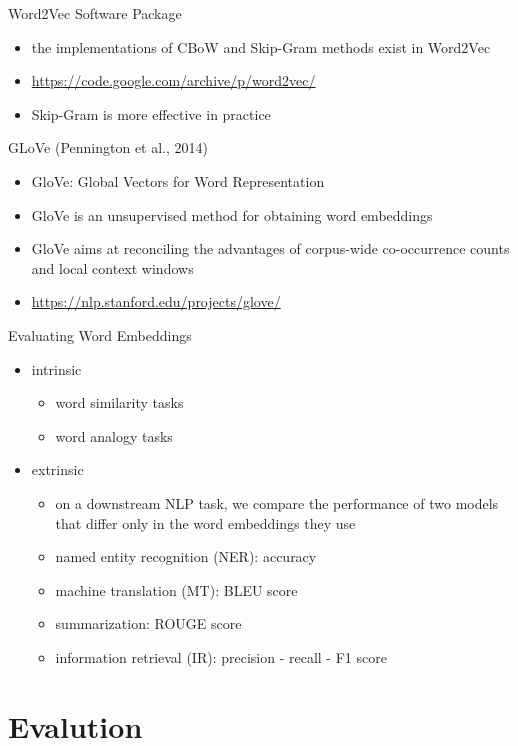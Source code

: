 \documentclass[12pt, handout]{beamer}
\begin{document}
\begin{frame}{Word2Vec Software Package}
	\begin{itemize}
		\item<1-> the implementations of CBoW and Skip-Gram methods exist in Word2Vec
		\item<1-> \url{https://code.google.com/archive/p/word2vec/}
		\item<2-> Skip-Gram is more effective in practice
	\end{itemize}
\end{frame}
\begin{frame}{GLoVe (Pennington et al., 2014)}\begin{itemize}
		\item GloVe: Global Vectors for Word Representation
		\item GloVe is an unsupervised method for obtaining word embeddings
		\item GloVe aims at reconciling the advantages of corpus-wide co-occurrence counts and local context windows
		\item \url{https://nlp.stanford.edu/projects/glove/}
	\end{itemize}
\end{frame}
\begin{frame}{Evaluating Word Embeddings}
	\begin{itemize}
		\item<1-> intrinsic
		\begin{itemize}
			\item<2-> word similarity tasks
			\item<2-> word analogy tasks
		\end{itemize}
		\item<3-> extrinsic
		\begin{itemize}
			\item<4-> on a downstream NLP task, we compare the performance of two models that differ only in the word embeddings they use
			\item<5-> named entity recognition (NER): accuracy
			\item<6-> machine translation (MT): BLEU score
			\item<7-> summarization: ROUGE score
			\item<8-> information retrieval (IR): precision - recall - F1 score
		\end{itemize}
	\end{itemize}
\end{frame}

\section{Evalution}
\end{document}
